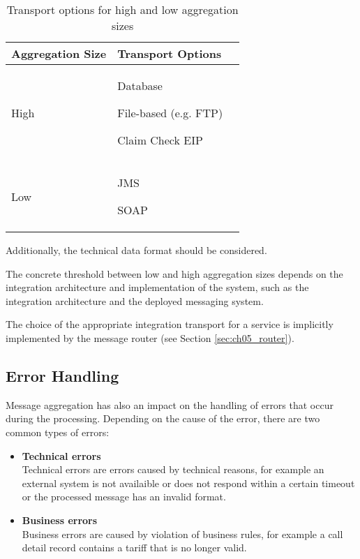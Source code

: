 \begin{table}[htbp]
	\centering
	\begin{tabularx}{\textwidth}{@{} X X X @{}}
		\caption{Transport options for high and low aggregation sizes}\label{table:ch05_transports}\\
		\toprule
		\bfseries Aggregation Size & \bfseries Transport Options\\
		\midrule
		High & \savespace
		\begin{titemize}
			\item Database
			\item File-based (e.g. \ac{FTP})
			\item Claim Check \ac{EIP}
		\end{titemize}\\
		\midrule
		Low & \savespace
		\begin{titemize}
			\item \ac{JMS}
			\item SOAP
		\end{titemize}\\
		\bottomrule
	\end{tabularx}
\end{table}

Additionally, the technical data format should be considered. 

The concrete threshold between low and high aggregation sizes depends on the integration architecture and implementation of the system, such as the integration architecture and the deployed messaging system.

The choice of the appropriate integration transport for a service is implicitly implemented by the message router (see Section \ref{sec:ch05_router}).

\subsection{Error Handling}

Message aggregation has also an impact on the handling of errors that occur during the processing. Depending on the cause of the error, there are two common types of errors: 
\begin{itemize}
	\item \textbf{Technical errors}\\
	Technical errors are errors caused by technical reasons, for example an external system is not availaible or does not respond within a certain timeout or the processed message has an invalid format.
	\item \textbf{Business errors}\\
	Business errors are caused by violation of business rules, for example a call detail record contains a tariff that is no longer valid.
\end{itemize}

